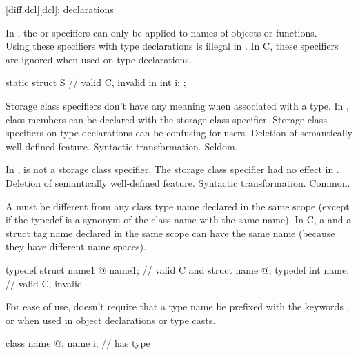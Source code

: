[diff.dcl]{\ref{dcl}: declarations}

\change
In \Cpp{}, the  or  specifiers can only be applied to names of objects or functions.\\
Using these specifiers with type declarations is illegal in \Cpp{}.
In C, these specifiers are ignored when used on type declarations.

\begin{example}
\begin{codeblock}
static struct S {               // valid C, invalid in \Cpp{}
  int i;
};
\end{codeblock}
\end{example}

\rationale
Storage class specifiers don't have any meaning when associated
with a type.
In \Cpp{}, class members can be declared with the  storage
class specifier.
Storage class specifiers on type
declarations can be confusing for users.
\effect
Deletion of semantically well-defined feature.
\difficulty
Syntactic transformation.
\howwide
Seldom.

\change
In \Cpp{},  is not a storage class specifier.
\rationale
The storage class specifier had no effect in \Cpp{}.
\effect
Deletion of semantically well-defined feature.
\difficulty
Syntactic transformation.
\howwide
Common.

\change
A \Cpp{}  must be different from any class type name declared
in the same scope (except if the typedef is a synonym of the class name with the
same name). In C, a  and a struct tag name declared in the same scope
can have the same name (because they have different name spaces).

\begin{example}
\begin{codeblock}
typedef struct name1 { @\commentellip@ } name1;         // valid C and \Cpp{}
struct name { @\commentellip@ };
typedef int name;               // valid C, invalid \Cpp{}
\end{codeblock}
\end{example}

\rationale
For ease of use, \Cpp{} doesn't require that a type name be prefixed
with the keywords ,  or  when used in object
declarations or type casts.

\begin{example}
\begin{codeblock}
class name { @\commentellip@ };
name i;                         //  has type 
\end{codeblock}
\end{example}

